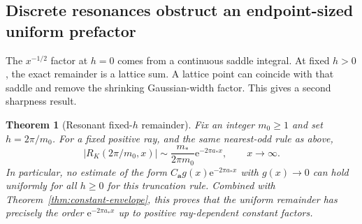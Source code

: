 \documentclass[11pt,a4paper]{article}
\numberwithin{equation}{section}
\newtheorem{theorem}{Theorem}[section]
\theoremstyle{definition}\newtheorem{definition}[theorem]{Definition}
\theoremstyle{remark}\newtheorem{remark}[theorem]{Remark}
\newcommand{\e}{\mathrm e}
\newcommand{\avec}{\boldsymbol a}
\newcommand{\amin}{a_*}
\newcommand{\mmin}{m_*}
\begin{document}
\subsection{Discrete resonances obstruct an endpoint-sized uniform prefactor}
The $x^{-1/2}$ factor at $h=0$ comes from a continuous saddle integral.
At fixed $h>0$, the exact remainder is a lattice sum. A lattice point can
coincide with that saddle and remove the shrinking Gaussian-width factor.
This gives a second sharpness result.

\begin{theorem}[Resonant fixed-$h$ remainder]
\label{thm:resonance}
Fix an integer $m_0\ge1$ and set $h=2\pi/m_0$. For a fixed positive ray,
and the same nearest-odd rule as above,
\begin{equation}
 |R_K(2\pi/m_0,x)|\sim\frac{\mmin}{2\pi m_0}
                  \e^{-2\pi\amin x},\qquad x\to\infty.
 \label{eq:resonance}
\end{equation}
In particular, no estimate of the form
$C_{\avec}g(x)\e^{-2\pi\amin x}$ with $g(x)\to0$ can hold uniformly for
all $h\ge0$ for this truncation rule. Combined with
Theorem~\ref{thm:constant-envelope}, this proves that the uniform remainder
has precisely the order $\e^{-2\pi\amin x}$ up to positive ray-dependent
constant factors.
\end{theorem}
\end{document}
